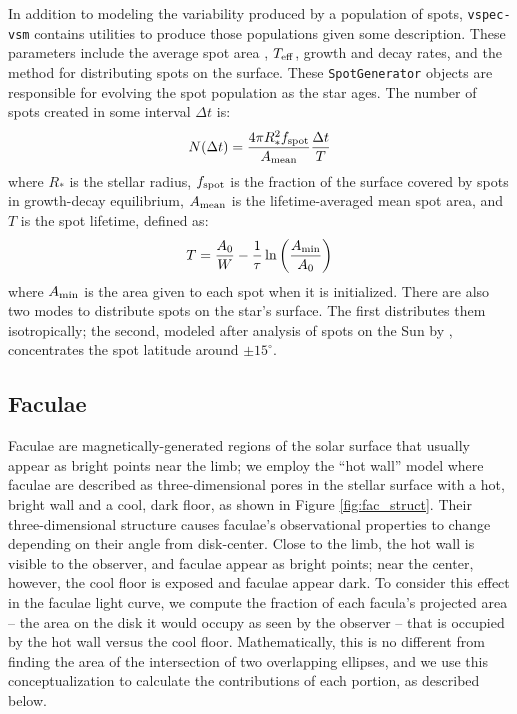 \documentclass[linenumbers,5p,twocolumn,authoryear]{elsarticle}
\newcommand{\teff}{$T_{\rm eff}$}
\begin{document}
In addition to modeling the variability produced by a population of spots, \texttt{vspec-vsm} contains utilities to produce those populations given some description.
These parameters include the average spot area \citep[lognormally distributed, ][]{bogdan1988}, \teff, growth and decay rates, and the method for distributing spots on the surface. These \texttt{SpotGenerator} objects are responsible for evolving the spot population as the star ages. The number of spots created in some interval $\Delta t$ is:
\begin{equation}
    N(\Delta t) = \frac{4 \pi R_*^2 f_{\rm spot}}{A_{\rm mean}} \frac{\Delta t}{T}
\end{equation}
where $R_*$ is the stellar radius, $f_{\rm spot}$ is the fraction of the surface covered by spots in growth-decay equilibrium, $A_{\rm mean}$ is the lifetime-averaged mean spot area, and $T$ is the spot lifetime, defined as:
\begin{equation}
    T = \frac{A_0}{W} - \frac{1}{\tau} \ln{\left (\frac{A_{\rm min}}{A_0}\right )}
\end{equation}
where $A_{\rm min}$ is the area given to each spot when it is initialized. There are also two modes to distribute spots on the star's surface. The first distributes them isotropically; the second, modeled after analysis of spots on the Sun by \citet{mandal2017}, concentrates the spot latitude around $\pm 15^{\circ}$.


\subsection{Faculae \label{subsec:faculae}}
Faculae are magnetically-generated regions of the solar surface that usually appear as bright points near the limb; we employ the ``hot wall''
model \citep{spruit1976} where faculae are described as three-dimensional pores in the stellar surface with a hot, bright wall and a cool, dark floor, as shown in Figure \ref{fig:fac_struct}. Their three-dimensional structure causes faculae's observational properties to change depending on their angle from disk-center. Close to the limb,
the hot wall is visible to the observer, and faculae appear as bright points; near the center, however, the cool floor is exposed and faculae appear dark. To consider this effect in the faculae light curve, we compute the fraction of each facula's projected area -- the area on the disk it would occupy as seen by the observer -- that is occupied by the hot wall versus the cool floor. Mathematically, this is no different from finding the area of the intersection of two overlapping ellipses, and we use this conceptualization to calculate the contributions of each portion, as described below.
\end{document}
